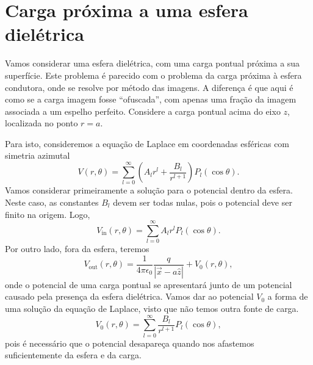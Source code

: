 \documentclass{article}
\begin{document}
\section{Carga próxima a uma esfera dielétrica}
Vamos considerar uma esfera dielétrica, com uma carga pontual próxima a sua superfície. Este problema é parecido com o problema da carga próxima à esfera condutora,
onde se resolve por método das imagens. A diferença é que aqui é como se a carga imagem fosse ``ofuscada'', com apenas uma fração da imagem associada a um espelho
perfeito. Considere a carga pontual acima do eixo $z$, localizada no ponto $r = a$.

Para isto, consideremos a equação de Laplace em coordenadas esféricas com simetria azimutal
\begin{equation}
 V(r,\theta) = \sum_{l = 0}^{\infty} \left( A_l r^l + \frac{B_l}{r^{l+1}} \right) P_l (\cos{\theta})\mathrm{.}
\end{equation}
Vamos considerar primeiramente a solução para o potencial dentro da esfera. Neste caso, as constantes $B_l$ devem ser todas nulas, pois o potencial deve ser finito
na origem. Logo,
\begin{equation}
 V_{\mathrm{in}}(r,\theta) = \sum_{l = 0}^{\infty} A_l r^l P_l (\cos{\theta})\mathrm{.}
\end{equation}
Por outro lado, fora da esfera, teremos
\begin{equation}
 V_{\mathrm{out}}(r,\theta) = \frac{1}{4 \pi \epsilon_0} \frac{q}{|\vec{x} - a\hat{z}|} + V_0(r,\theta)\mathrm{,}
\end{equation}
onde o potencial de uma carga pontual se apresentará junto de um potencial causado pela presença da esfera dielétrica. Vamos dar ao potencial $V_0$ a forma de uma
solução da equação de Laplace, visto que não temos outra fonte de carga.
\begin{equation}
 V_0(r,\theta) = \sum_{l = 0}^{\infty} \frac{B_l}{r^{l+1}} P_l (\cos{\theta})\mathrm{,}
\end{equation}
pois é necessário que o potencial desapareça quando nos afastemos suficientemente da esfera e da carga.
\end{document}

